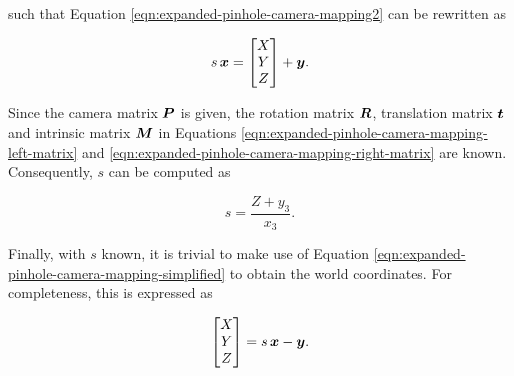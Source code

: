 such that Equation \ref{eqn:expanded-pinhole-camera-mapping2} can be rewritten as

\begin{equation}
	s\,\bm{x}=
	\begin{bmatrix}
		X \\ 
		Y \\ 
		Z
	\end{bmatrix}
	+\bm{y}.
	\label{eqn:expanded-pinhole-camera-mapping-simplified}
\end{equation}

Since the camera matrix $\bm{P}$ is given, the rotation matrix $\bm{R}$, translation matrix $\bm{t}$ and intrinsic matrix $\bm{M}$ in Equations \ref{eqn:expanded-pinhole-camera-mapping-left-matrix} and \ref{eqn:expanded-pinhole-camera-mapping-right-matrix} are known. Consequently, $s$ can be computed as

\begin{equation}
	s=\frac{Z+y_3}{x_3}.
	\label{eqn:expanded-pinhole-camera-mapping-scaling-factor}
\end{equation}

Finally, with $s$ known, it is trivial to make use of Equation \ref{eqn:expanded-pinhole-camera-mapping-simplified} to obtain the world coordinates. For completeness, this is expressed as

\begin{equation}
	\begin{bmatrix}
		X \\ 
		Y \\ 
		Z
	\end{bmatrix}=
	s\,\bm{x}-\bm{y}.
	\label{eqn:expanded-pinhole-camera-mapping-final}
\end{equation}


